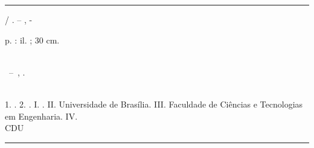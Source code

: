 \begin{fichacatalografica}
	\vspace*{\fill}					%
	\hrule							%
	\begin{center}					%
	\begin{minipage}[c]{12.5cm}		%
	
	\imprimirautor
	
	\hspace{0.5cm} \imprimirtitulo  / \imprimirautor. --
	\imprimirlocal, \imprimirdata-
	
	\hspace{0.5cm} \pageref{LastPage} p. : il. ; 30 cm.\\
	
	\hspace{0.5cm} \imprimirorientadorRotulo~\imprimirorientador\\
	
	\hspace{0.5cm}
	\parbox[t]{\textwidth}{\imprimirtipotrabalho~--~\imprimirinstituicao,
	\imprimirdata.}\\
	
	\hspace{0.5cm}
		1. \imprimirpalavrachaveum.
		2. \imprimirpalavrachavedois.
		I. \imprimirorientador.
		II. Universidade de Brasília.
		III. Faculdade de Ciências e Tecnologias em Engenharia.
		IV. \imprimirtitulo\\ 			
	
	\hspace{8.75cm} CDU \nomecdu\\
	
	\end{minipage}
	\end{center}
	\hrule
\end{fichacatalografica}
